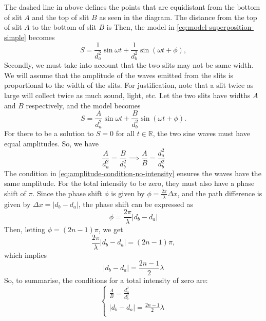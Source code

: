 \documentclass{paper}
\begin{document}
The dashed line in  above
defines the points that are equidistant from the bottom of slit $A$ and the top of slit $B$
as seen in the diagram. The distance from the top of slit $A$ to the bottom of slit $B$ is
Then, the model in \eqref{eq:model-superposition-simple}
becomes 
\begin{equation}
    S = \frac{1}{d_{a}^{2}}\sin{\omega{}t} + \frac{1}{d_{b}^{2}}\sin(\omega{}t + \phi),
\end{equation}
Secondly, we must take into account that the two slits may not be same width. We will
assume that the amplitude of the waves emitted from the slits is proportional to the width of the slits.
For justification, note that a slit twice as large will collect twice as much sound, light, etc.
Let the two slits have widths $A$ and $B$ respectively, and the model becomes
\begin{equation}
    S = \frac{A}{d_{a}^{2}}\sin{\omega{}t} + \frac{B}{d_{b}^{2}}\sin(\omega{}t + \phi).
\end{equation}
For there to be a solution to $S = 0$ for all $t\in\mathbb{R}$, the two sine waves
must have equal amplitudes. So, we have
\begin{equation}
    \label{eq:amplitude-condition-no-intensity}
    \frac{A}{d_{a}^{2}} = \frac{B}{d_{b}^{2}} \implies \frac{A}{B} = \frac{d_{a}^{2}}{d_{b}^{2}}       
\end{equation}
The condition in \eqref{eq:amplitude-condition-no-intensity}
ensures the waves have the same amplitude. For the total intensity to be zero,
they must also have a phase shift of $\pi$. Since the phase shift $\phi$ is given by
$\phi = \frac{2\pi}{\lambda}\Delta{x}$, and the path difference is given by $\Delta{x} = \lvert{}d_b - d_{a}\rvert$,
the phase shift can be expressed as 
\begin{equation}
    \label{eq:phase-shift-formula}
    \phi = \frac{2\pi}{\lambda}\left\lvert{}d_{b} - d_{a}\right\rvert
\end{equation}
Then, letting $\phi = (2n-1)\pi$, we get
\begin{equation*}
    \frac{2\pi}{\lambda}\left\lvert{}d_{b} - d_{a}\right\rvert = (2n-1)\pi,
\end{equation*}
which implies 
\begin{equation}
    \label{eq:phase-shift-condition-destructive-interference}
    \lvert{}d_{b} - d_{a}\rvert = \frac{2n-1}{2}\lambda
\end{equation}
So, to summarise, the conditions for a total intensity of zero are:
\begin{equation}
    \begin{cases}
        \frac{A}{B} = \frac{d_{a}^{2}}{d_{b}^{2}} \\
        \lvert{}d_{b} - d_{a}\rvert = \frac{2n-1}{2}\lambda \\
    \end{cases}
\end{equation}
\end{document}
